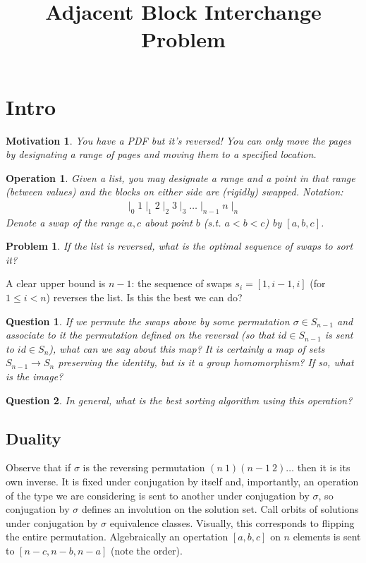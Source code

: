 \documentclass[12pt]{article}
\title{Adjacent Block Interchange Problem}
\theoremstyle{pf}
\newtheorem*{mot}{Motivation}
\newtheorem*{op}{Operation}
\newtheorem*{prob}{Problem}
\newtheorem*{q}{Question}
\begin{document}
\maketitle

\section{Intro}

\begin{mot}
    You have a PDF but it's reversed! You can only move the pages by
    designating a range of pages and moving them to a specified location.
\end{mot}

\begin{op}
    Given a list, you may designate a range and a point in that range (between
    values) and the blocks on either side are (rigidly) swapped.
    Notation:
    \begin{align*}
        \mid_0 1 \mid_1 2 \mid_2 3 \mid_3 \ldots \mid_{n-1} n \mid_n
    \end{align*}
    Denote a swap of the range $a,c$ about point $b$ (s.t. $a < b < c$) by
    $[a,b,c]$.
\end{op}

\begin{prob}
    If the list is reversed, what is the optimal sequence of swaps to sort it?
\end{prob}
A clear upper bound is $n-1$: the sequence of swaps $s_i = [1, i-1, i]$ (for
$1 \le i < n$) reverses the list. Is this the best we can do?

\begin{q}
    If we permute the swaps above by some permutation $\sigma \in S_{n-1}$
    and associate to it the permutation defined on the reversal (so that
    $id \in S_{n-1}$ is sent to $id \in S_n$), what can we say about this map?
    It is certainly a map of sets $S_{n-1} \to S_n$ preserving the identity,
    but is it a group homomorphism? If so, what is the image?
\end{q}

\begin{q}
    In general, what is the best sorting algorithm using this operation?
\end{q}

\subsection{Duality}
Observe that if $\sigma$ is the reversing permutation $(n \ 1) (n-1 \ 2) \ldots$
then it is its own inverse. It is fixed under conjugation by itself and,
importantly, an operation of the type we are considering is sent to another
under conjugation by $\sigma$, so conjugation by $\sigma$ defines an involution
on the solution set. Call orbits of solutions under conjugation by $\sigma$
equivalence classes. Visually, this corresponds to flipping the entire
permutation. Algebraically an opertation $[a,b,c]$ on $n$ elements is sent
to $[n - c, n - b, n - a]$ (note the order).
\end{document}
